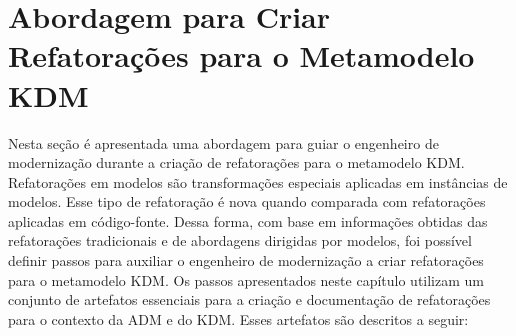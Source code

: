 
\section{Abordagem para Criar Refatorações para o Metamodelo KDM}\label{sec:estrategiasParaAdaptarRefatoracoesParaOMetamodeloKDM}

Nesta seção é apresentada uma abordagem para guiar o engenheiro de modernização durante a criação de refatorações para o metamodelo KDM. Refatorações em modelos são transformações especiais aplicadas em instâncias de modelos. Esse tipo de refatoração é nova quando comparada com refatorações aplicadas em código-fonte. Dessa forma, com base em informações obtidas das refatorações tradicionais e de abordagens dirigidas por modelos, foi possível definir passos para auxiliar o engenheiro de modernização a criar refatorações para o metamodelo KDM. Os passos apresentados neste capítulo utilizam um conjunto de artefatos essenciais para a criação e documentação de refatorações para o contexto da ADM e do KDM. Esses artefatos são descritos a seguir:

